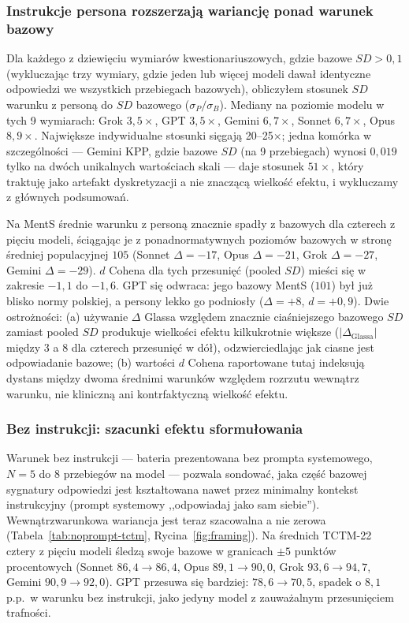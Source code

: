 \documentclass[11pt,a4paper]{article}
\begin{document}
\subsubsection*{Instrukcje persona rozszerzają wariancję ponad warunek bazowy}

Dla każdego z dziewięciu wymiarów kwestionariuszowych, gdzie bazowe $SD > 0{,}1$ (wykluczając trzy wymiary, gdzie jeden lub więcej modeli dawał identyczne odpowiedzi we wszystkich przebiegach bazowych), obliczyłem stosunek $SD$ warunku z personą do $SD$ bazowego ($\sigma_P / \sigma_B$). Mediany na poziomie modelu w tych 9 wymiarach: Grok $3{,}5\times$, GPT $3{,}5\times$, Gemini $6{,}7\times$, Sonnet $6{,}7\times$, Opus $8{,}9\times$. Największe indywidualne stosunki sięgają 20--25$\times$; jedna komórka w szczególności --- Gemini KPP, gdzie bazowe $SD$ (na 9 przebiegach) wynosi $0{,}019$ tylko na dwóch unikalnych wartościach skali --- daje stosunek $51\times$, który traktuję jako artefakt dyskretyzacji a nie znaczącą wielkość efektu, i wykluczamy z głównych podsumowań.

Na MentS średnie warunku z personą znacznie spadły z bazowych dla czterech z pięciu modeli, ściągając je z ponadnormatywnych poziomów bazowych w stronę średniej populacyjnej $105$ (Sonnet $\Delta = -17$, Opus $\Delta = -21$, Grok $\Delta = -27$, Gemini $\Delta = -29$). $d$ Cohena dla tych przesunięć (pooled $SD$) mieści się w zakresie $-1{,}1$ do $-1{,}6$. GPT się odwraca: jego bazowy MentS ($101$) był już blisko normy polskiej, a persony lekko go podniosły ($\Delta = +8$, $d = +0{,}9$). Dwie ostrożności: (a) używanie $\Delta$ Glassa względem znacznie ciaśniejszego bazowego $SD$ zamiast pooled $SD$ produkuje wielkości efektu kilkukrotnie większe ($|\Delta_{\text{Glassa}}|$ między 3 a 8 dla czterech przesunięć w dół), odzwierciedlając jak ciasne jest odpowiadanie bazowe; (b) wartości $d$ Cohena raportowane tutaj indeksują dystans między dwoma średnimi warunków względem rozrzutu wewnątrz warunku, nie kliniczną ani kontrfaktyczną wielkość efektu.

\subsubsection*{Bez instrukcji: szacunki efektu sformułowania}

Warunek bez instrukcji --- bateria prezentowana bez prompta systemowego, $N = 5$ do $8$ przebiegów na model --- pozwala sondować, jaka część bazowej sygnatury odpowiedzi jest kształtowana nawet przez minimalny kontekst instrukcyjny (prompt systemowy ,,odpowiadaj jako sam siebie''). Wewnątrzwarunkowa wariancja jest teraz szacowalna a nie zerowa (Tabela~\ref{tab:noprompt-tctm}, Rycina~\ref{fig:framing}). Na średnich TCTM-22 cztery z pięciu modeli śledzą swoje bazowe w granicach $\pm 5$ punktów procentowych (Sonnet $86{,}4 \to 86{,}4$, Opus $89{,}1 \to 90{,}0$, Grok $93{,}6 \to 94{,}7$, Gemini $90{,}9 \to 92{,}0$). GPT przesuwa się bardziej: $78{,}6 \to 70{,}5$, spadek o $8{,}1$ p.p.\ w warunku bez instrukcji, jako jedyny model z zauważalnym przesunięciem trafności.
\end{document}
